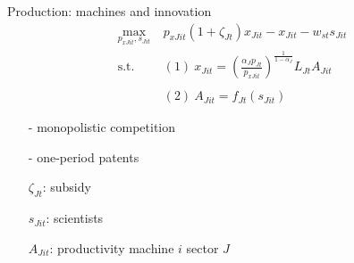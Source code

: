 \documentclass[11pt,aspectratio=169]{beamer}
\begin{document}
\begin{frame}{Production: machines and innovation}
\vspace{-8mm}
\begin{align*}
	\underset{p_{xJit}, s_{Jit}}{\max}\ & p_{xJit}(1+\zeta_{Jt})x_{Jit}-x_{Jit}-w_{st}s_{Jit}
	\\ 
	\text{s.t.}\ &(1)\ x_{Jit}=\left(\frac{\alpha_Jp_{Jt}}{p_{xJit}}\right)^{\frac{1}{1-\alpha_J}}L_{Jt}A_{Jit}\\ \ \\ %
	& (2)\ A_{Jit}=f_{Jt}(s_{Jit})%
\end{align*}

\small
\vspace{4mm}
\hspace{-4mm}	\begin{minipage}[t!]{0.32\textwidth}
	\vspace{0mm}
	\begin{itemize}
		\item[-] monopolistic competition 
		\vspace{-4mm}
		\item[-] one-period patents
	\end{itemize}	
\end{minipage}
\begin{minipage}[t!]{0.5\textwidth}
	\vspace{0mm}
	\begin{itemize}	
		\item[]$\zeta_{Jt}$: subsidy
		\vspace{-2mm}	
		\item[]$s_{Jit}$: scientists
		\vspace{-2mm}	
		\item[]$A_{Jit}$: productivity machine $i$ sector $J$
	\end{itemize}
\end{minipage}
\end{frame}
\end{document}
